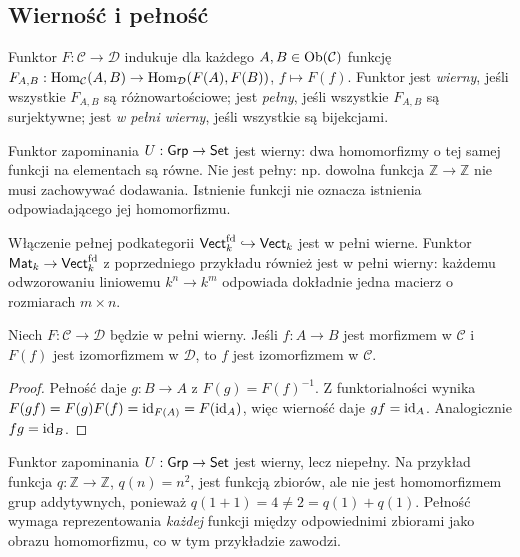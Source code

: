 \subsection{Wierność i pełność}

\begin{definicja}\label{def:pelny}
Funktor $F:\mathcal C\to\mathcal D$ indukuje dla każdego $A,B\in\operatorname{Ob}(\mathcal C)$ funkcję $F_{A,B}:\operatorname{Hom}_{\mathcal C}(A,B)\to\operatorname{Hom}_{\mathcal D}(F(A),F(B))$, $f\mapsto F(f)$. Funktor jest \emph{wierny}, jeśli wszystkie $F_{A,B}$ są różnowartościowe; jest \emph{pełny}, jeśli wszystkie $F_{A,B}$ są surjektywne; jest \emph{w pełni wierny}, jeśli wszystkie są bijekcjami.
\end{definicja}

\begin{przyklad}
Funktor zapominania $U:\mathsf{Grp}\to\mathsf{Set}$ jest wierny: dwa homomorfizmy o tej samej funkcji na elementach są równe. Nie jest pełny: np. dowolna funkcja $\mathbb Z\to\mathbb Z$ nie musi zachowywać dodawania. Istnienie funkcji nie oznacza istnienia odpowiadającego jej homomorfizmu.
\end{przyklad}

\begin{przyklad}
Włączenie pełnej podkategorii $\mathsf{Vect}_k^{\mathrm{fd}}\hookrightarrow\mathsf{Vect}_k$ jest w pełni wierne. Funktor $\mathsf{Mat}_k\to\mathsf{Vect}_k^{\mathrm{fd}}$ z poprzedniego przykładu również jest w pełni wierny: każdemu odwzorowaniu liniowemu $k^n\to k^m$ odpowiada dokładnie jedna macierz o rozmiarach $m\times n$.
\end{przyklad}


\begin{stwierdzenie}\label{tw:ff-reflect-iso}
Niech $F:\mathcal C\to\mathcal D$ będzie w pełni wierny. Jeśli $f:A\to B$ jest morfizmem w $\mathcal C$ i $F(f)$ jest izomorfizmem w $\mathcal D$, to $f$ jest izomorfizmem w $\mathcal C$.
\end{stwierdzenie}
\begin{proof}
Pełność daje $g:B\to A$ z $F(g)=F(f)^{-1}$. Z funktorialności wynika $F(gf)=F(g)F(f)=\mathrm{id}_{F(A)}=F(\mathrm{id}_A)$, więc wierność daje $gf=\mathrm{id}_A$. Analogicznie $fg=\mathrm{id}_B$.
\end{proof}

\begin{przyklad}
Funktor zapominania $U:\mathsf{Grp}\to\mathsf{Set}$ jest wierny, lecz niepełny. Na przykład funkcja $q:\mathbb Z\to\mathbb Z$, $q(n)=n^2$, jest funkcją zbiorów, ale nie jest homomorfizmem grup addytywnych, ponieważ $q(1+1)=4\neq 2=q(1)+q(1)$. Pełność wymaga reprezentowania \emph{każdej} funkcji między odpowiednimi zbiorami jako obrazu homomorfizmu, co w tym przykładzie zawodzi.
\end{przyklad}


